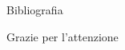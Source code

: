 \documentclass[9pt]{beamer}
\begin{document}

\begin{frame}{Bibliografia}

	
	

\end{frame}

\begin{frame}[standout]
Grazie per l'attenzione
\end{frame}
\end{document}

